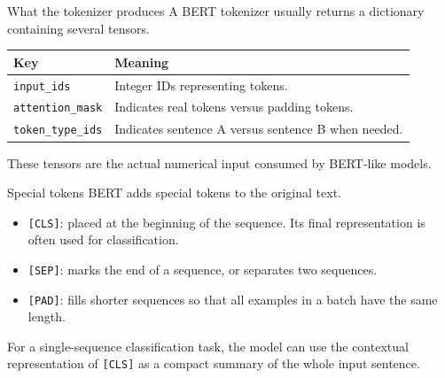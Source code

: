 \documentclass[aspectratio=169]{beamer}
\begin{document}
\begin{frame}{What the tokenizer produces}
A BERT tokenizer usually returns a dictionary containing several tensors.

\vspace{0.3cm}

\begin{center}
\begin{tabular}{ll}
\toprule
\textbf{Key} & \textbf{Meaning} \\
\midrule
\texttt{input\_ids} & Integer IDs representing tokens. \\
\texttt{attention\_mask} & Indicates real tokens versus padding tokens. \\
\texttt{token\_type\_ids} & Indicates sentence A versus sentence B when needed. \\
\bottomrule
\end{tabular}
\end{center}

\vspace{0.3cm}

These tensors are the actual numerical input consumed by BERT-like models.
\end{frame}

\begin{frame}{Special tokens}
BERT adds special tokens to the original text.

\vspace{0.3cm}

\begin{itemize}
    \item \texttt{[CLS]}: placed at the beginning of the sequence. Its final representation is often used for classification.
    \item \texttt{[SEP]}: marks the end of a sequence, or separates two sequences.
    \item \texttt{[PAD]}: fills shorter sequences so that all examples in a batch have the same length.
\end{itemize}

\vspace{0.3cm}

For a single-sequence classification task, the model can use the contextual representation of \texttt{[CLS]} as a compact summary of the whole input sentence.
\end{frame}
\end{document}
